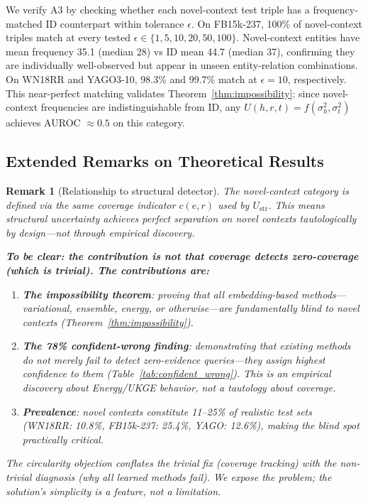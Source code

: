 \documentclass{article}
\newtheorem{remark}[theorem]{Remark}
\begin{document}
We verify A3 by checking whether each novel-context test triple has a frequency-matched ID counterpart within tolerance $\epsilon$.
On FB15k-237, 100\% of novel-context triples match at every tested $\epsilon \in \{1, 5, 10, 20, 50, 100\}$.
Novel-context entities have mean frequency 35.1 (median 28) vs ID mean 44.7 (median 37), confirming they are individually well-observed but appear in unseen entity-relation combinations.
On WN18RR and YAGO3-10, 98.3\% and 99.7\% match at $\epsilon{=}10$, respectively.
This near-perfect matching validates Theorem~\ref{thm:impossibility}: since novel-context frequencies are indistinguishable from ID, any $U(h,r,t) = f(\sigma^2_h, \sigma^2_t)$ achieves AUROC $\approx 0.5$ on this category.

\subsection{Extended Remarks on Theoretical Results}

\begin{remark}[Relationship to structural detector]
\label{rem:circularity}
The novel-context category is defined via the same coverage indicator $c(e,r)$ used by $U_{\text{str}}$. This means structural uncertainty achieves perfect separation on novel contexts \emph{tautologically by design}---not through empirical discovery.

\textbf{To be clear: the contribution is not that coverage detects zero-coverage (which is trivial). The contributions are:}
\begin{enumerate}
\item[(a)] \textbf{The impossibility theorem}: proving that \emph{all} embedding-based methods---variational, ensemble, energy, or otherwise---are fundamentally blind to novel contexts (Theorem~\ref{thm:impossibility}).
\item[(b)] \textbf{The 78\% confident-wrong finding}: demonstrating that existing methods do not merely fail to detect zero-evidence queries---they assign \emph{highest confidence} to them (Table~\ref{tab:confident_wrong}). This is an empirical discovery about Energy/UKGE behavior, not a tautology about coverage.
\item[(c)] \textbf{Prevalence}: novel contexts constitute 11--25\% of realistic test sets (WN18RR: 10.8\%, FB15k-237: 25.4\%, YAGO: 12.6\%), making the blind spot practically critical.
\end{enumerate}
The circularity objection conflates the trivial fix (coverage tracking) with the non-trivial diagnosis (why all learned methods fail). We expose the problem; the solution's simplicity is a feature, not a limitation.
\end{remark}
\end{document}
